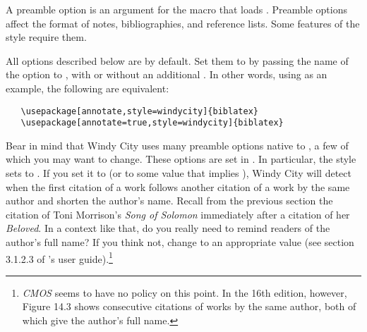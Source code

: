 \documentclass[11pt,letterpaper,oneside]{article}
\begin{document}
A preamble option is an argument for the  macro that
loads \biblatex. Preamble options affect the format of notes,
bibliographies, and reference lists. Some features of the style
require them.

All options described below are  by default. Set them to
 by passing the name of the option to \biblatex, with or
without an additional . In other words, using
 as an example, the following are equivalent:

\begin{verbatim}
   \usepackage[annotate,style=windycity]{biblatex}
   \usepackage[annotate=true,style=windycity]{biblatex}
\end{verbatim}

Bear in mind that Windy City uses many preamble options native to
\biblatex, a few of which you may want to change. These options are
set in . In particular, the style sets
 to . If you set it to  (or to
some value that implies ), Windy City will detect when the
first citation of a work follows another citation of a work by the
same author and shorten the author's name. Recall from the previous
section the citation of Toni Morrison's \textit{Song of Solomon}
immediately after a citation of her \textit{Beloved}. In a context
like that, do you really need to remind readers of the author's full
name? If you think not, change  to an appropriate
value (see section 3.1.2.3 of \biblatex's user
guide).\footnote{\textit{CMOS} seems to have no policy on this point.
In the 16th edition, however, Figure 14.3 shows consecutive citations
of works by the same author, both of which give the author's full
name.}
\end{document}
